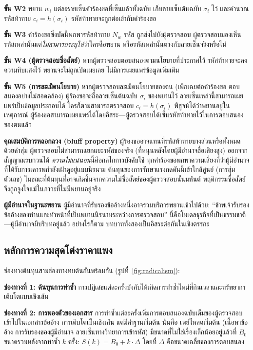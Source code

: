 \documentclass[11pt,a4paper,twocolumn]{article}
\begin{document}
\textbf{ขั้น W2} พยาน $w_i$ แต่ละรายเซ็นคำร้องขอที่เซ็นแล้วทั้งฉบับ เก็บลายเซ็นต้นฉบับ $\sigma_i$ ไว้ และคำนวณรหัสท้าทาย $c_i = h(\sigma_i)$ รหัสท้าทายจะถูกต่อเข้ากับคำร้องขอ

\textbf{ขั้น W3} คำร้องขอซึ่งบัดนี้พกพารหัสท้าทาย $N_w$ รหัส ถูกส่งไปยังผู้ตรวจสอบ ผู้ตรวจสอบมองเห็นรหัสเหล่านั้นแต่\emph{ไม่สามารถระบุได้}ว่าใครคือพยาน หรือรหัสเหล่านั้นตรงกับลายเซ็นจริงหรือไม่

\textbf{ขั้น W4 (ผู้ตรวจสอบซื่อสัตย์)} หากผู้ตรวจสอบตอบสนองตามนโยบายที่ประกาศไว้ รหัสท้าทายจะคงความทึบแสงไว้ พยานจะไม่ถูกเปิดเผยเลย ไม่มีการเผยแพร่ข้อมูลเพิ่มเติม

\textbf{ขั้น W5 (การละเมิดนโยบาย)} หากผู้ตรวจสอบละเมิดนโยบายของตน (เพิกเฉยต่อคำร้องขอ ตอบสนองอย่างไม่สอดคล้อง) ผู้ร้องขอจะถือลายเซ็นต้นฉบับ $\sigma_i$ ของพยานไว้ ลายเซ็นเหล่านี้สามารถเผยแพร่เป็นข้อมูลประกอบได้ ใครก็ตามสามารถตรวจสอบ $c_i = h(\sigma_i)$ พิสูจน์ได้ว่าพยานอยู่ในเหตุการณ์ ผู้ร้องขอสามารถเผยแพร่ได้โดยอิสระ---ผู้ตรวจสอบได้เซ็นรหัสท้าทายไว้ในการตอบสนองของตนแล้ว

\textbf{คุณสมบัติการหลอกลวง (bluff property)} ผู้ร้องขออาจแทนที่รหัสท้าทายบางส่วนหรือทั้งหมดด้วยค่าสุ่ม ผู้ตรวจสอบไม่สามารถแยกแยะรหัสของจริง (ที่หนุนหลังโดยผู้มีอำนาจชื่อเสียงสูง) ออกจากสัญญาณรบกวนได้ \emph{ความไม่แน่นอน}นี้คือกลไกการบังคับใช้ ทุกคำร้องขอพกพาความเสี่ยงที่ว่าผู้มีอำนาจที่ได้รับการเคารพกำลังเฝ้าดูอยู่แบบนิรนาม ต้นทุนของการรักษาแรงกดดันนี้เข้าใกล้ศูนย์ (การสุ่มตัวเลข) ในขณะที่ต้นทุนที่อาจเกิดขึ้นจากความไม่ซื่อสัตย์ของผู้ตรวจสอบนั้นมหันต์ พฤติกรรมซื่อสัตย์จึงถูกจูงใจแม้ในภาวะที่ไม่มีพยานอยู่จริง

\textbf{ผู้มีอำนาจในฐานะพยาน} ผู้มีอำนาจที่รับรองข้ออ้างหนึ่งอาจรวมบริการพยานเข้าไปด้วย: ``ข้าพเจ้ารับรองข้ออ้างของท่านและทำหน้าที่เป็นพยานนิรนามระหว่างการตรวจสอบ'' นี่คือโมเดลธุรกิจที่เป็นธรรมชาติ---ผู้มีอำนาจมีบริบทอยู่แล้ว อย่างไรก็ตาม บทบาททั้งสองเป็นอิสระต่อกันในเชิงตรรกะ

\subsection{หลักการความสุดโต่งราคาแพง}

ช่องทางต้นทุนสามช่องทางทบต้นกันพร้อมกัน (รูปที่~\ref{fig:radicalism}):

\textbf{ช่องทางที่ 1: ต้นทุนการทำซ้ำ} การปฏิเสธแต่ละครั้งบังคับให้เกิดการทำซ้ำใหม่ที่กินเวลาและทรัพยากร เติบโตแบบเชิงเส้น

\textbf{ช่องทางที่ 2: การพองตัวของเอกสาร} การทำซ้ำแต่ละครั้งเพิ่มการตอบสนองฉบับเต็มของผู้ตรวจสอบเข้าไปในเอกสารข้ออ้าง การเติบโตเป็นเชิงเส้น แต่มีค่าฐานเริ่มต้น นั่นคือ เพย์โหลดเริ่มต้น (เนื้อหาข้ออ้าง การรับรองของผู้มีอำนาจ ลายเซ็นทางวิทยาการเข้ารหัส) มีขนาดที่ไม่ใช่เรื่องเล็กน้อยอยู่แล้วที่ $B_0$ ขนาดรวมหลังจากทำซ้ำ $k$ ครั้ง: $S(k) = B_0 + k \cdot \Delta$ โดยที่ $\Delta$ คือขนาดเฉลี่ยของการตอบสนอง
\end{document}
